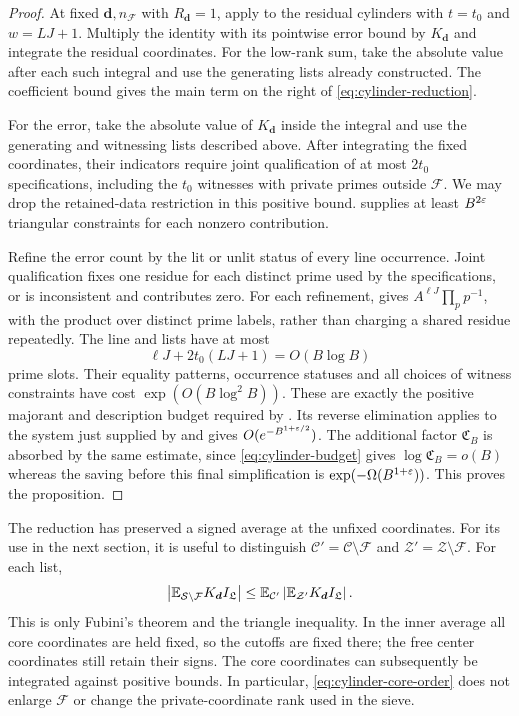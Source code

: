 \begin{proof}
At fixed $\boldsymbol d,n_{\mathcal F}$ with $R_{\boldsymbol d}=1$, apply
 to the residual cylinders with
$t=t_0$ and $w=LJ+1$.  Multiply the identity with its pointwise error
bound by $K_{\boldsymbol d}$ and integrate the residual coordinates.
For the low-rank sum, take the absolute value after each such integral
and use the generating lists already constructed.  The coefficient
bound gives the main term on the right of
\eqref{eq:cylinder-reduction}.

For the error, take the absolute value of $K_{\boldsymbol d}$ inside the
integral and use the generating and witnessing lists described above.
After integrating the fixed coordinates, their indicators require
joint qualification of at most $2t_0$ specifications, including the
$t_0$ witnesses with private primes outside $\mathcal F$.
We may drop the retained-data restriction in this positive bound.
 supplies at least $B^{2\varepsilon}$ triangular
constraints for each nonzero contribution.

Refine the error count by the lit or unlit status of every line
occurrence.  Joint qualification fixes one residue for each distinct
prime used by the specifications, or is inconsistent and contributes
zero.  For each refinement,  gives
$A^{\ell J}\prod_p p^{-1}$, with the product over distinct prime labels,
rather than charging a shared residue repeatedly.  The line and lists
have at most
\[
       \ell J+2t_0(LJ+1)=O(B\log B)
\]
prime slots.  Their equality patterns, occurrence statuses and all
choices of witness constraints have cost $\exp(O(B\log^2 B))$.
These are exactly the
positive majorant and description budget required by
.  Its reverse elimination applies to the
system just supplied by  and gives
$O(e^{-B^{1+\varepsilon/2}})$.
The additional factor $\mathfrak C_B$ is absorbed by the same estimate, since
\eqref{eq:cylinder-budget} gives $\log \mathfrak C_B=o(B)$ whereas the saving
before this final simplification is $\exp(-\Omega(B^{1+\varepsilon}))$.
This proves the proposition.
\end{proof}

The reduction has preserved a signed average at the unfixed coordinates.
For its use in the next section, it is useful to distinguish
$\mathcal C'=\mathcal C\setminus\mathcal F$ and
$\mathcal Z'=\mathcal Z\setminus\mathcal F$.  For each list,
\begin{equation}\label{eq:cylinder-core-order}
 \left|\mathbb E_{\mathcal S\setminus\mathcal F}
              K_{\boldsymbol d}I_{\mathfrak L}\right|
 \le \mathbb E_{\mathcal C'}
       \left|\mathbb E_{\mathcal Z'}K_{\boldsymbol d}I_{\mathfrak L}\right|.
\end{equation}
This is only Fubini's theorem and the triangle inequality.  In the
inner average all core coordinates are held fixed, so the cutoffs are
fixed there; the free center coordinates still retain their signs.
The core coordinates can subsequently be integrated against positive
bounds.  In particular, \eqref{eq:cylinder-core-order} does not enlarge
$\mathcal F$ or change the private-coordinate rank used in the sieve.
